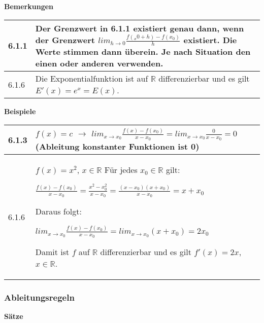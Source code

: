     \noindent
    \textbf{Bemerkungen}
    
    \begin{longtable}{p{1cm} p{16cm}}
        \toprule

        6.1.1 & Der Grenzwert in 6.1.1 existiert genau dann, wenn der Grenzwert $lim_{h \rightarrow 0} \frac{f(_x0 + h)-f(x_0)}{h}$
                existiert. Die Werte stimmen dann überein. Je nach Situation den einen oder anderen verwenden. \\
        \midrule
        6.1.6 & Die Exponentialfunktion ist auf $\mathbb{R}$ differenzierbar und es gilt $E'(x) = e^x = E(x)$. \\

        \bottomrule
    \end{longtable}
    

    \noindent
    \textbf{Beispiele}
    
    \begin{longtable}{p{1cm} p{16cm}}
        \toprule

        6.1.3 & $f(x) = c$ $\rightarrow$ $lim_{x \rightarrow x_0} \frac{f(x)-f(x_0)}{x-x_0} = lim_{x \rightarrow x_0}
                                \frac{0}{x-x_0} = 0$ (Ableitung konstanter Funktionen ist 0) \\
        \midrule
        6.1.6 & $f(x) = x^2$, $x \in \mathbb{R}$ \hfill \break
                Für jedes $x_0 \in \mathbb{R}$ gilt: \hfill \break
                \centerline{$\frac{f(x)-f(x_0)}{x-x_0}= \frac{x^2-x_0^2}{x-x_0} = \frac{(x-x_0)(x+x_0)}{x-x_0} = x+x_0$}
                Daraus folgt: \hfill \break
                \centerline{$lim_{x \rightarrow x_0} \frac{f(x)-f(x_0)}{x-x_0} = lim_{x \rightarrow x_0}(x+x_0) = 2x_0$}
                Damit ist $f$ auf $\mathbb{R}$ differenzierbar und es gilt $f'(x) = 2x$, $x \in \mathbb{R}$. \\
        \bottomrule
    \end{longtable}
    

    

\subsubsection{Ableitungsregeln}

    \noindent 
    \textbf{Sätze}
    
